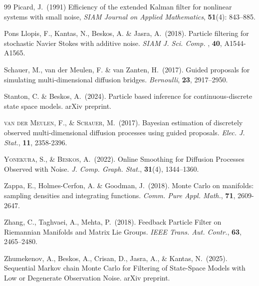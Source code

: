\documentclass[english,13pt]{article}
\numberwithin{equation}{section}
\begin{document}
\begin{thebibliography}{99}
{\sc Picard}, J.~(1991)  Efficiency of the extended Kalman filter for nonlinear systems with small noise, \emph{SIAM Journal on Applied Mathematics}, {\bf 51}(4): 843--885.

{\sc Pons Llopis}, F., {\sc Kantas}, N., {\sc Beskos}, A.  \& {\sc Jasra}, A.~(2018). Particle filtering for stochastic Navier Stokes with additive noise.  \emph{SIAM J. Sci. Comp. }, {\bf 40},  A1544-A1565.



{\sc Schauer}, M., {\sc van der Meulen}, F. \& {\sc van Zanten}, H.~(2017). Guided proposals for simulating multi-dimensional diffusion bridges. \emph{Bernoulli}, {\bf 23}, 2917--2950.

{\sc Stanton},   C.  \& {\sc Beskos},  A.~(2024).  Particle based inference for continuous-discrete state space models.  arXiv preprint.

\textsc{van der Meulen}, F., \& \textsc{Schauer}, M.~(2017). Bayesian estimation of discretely observed multi-dimensional diffusion processes using guided proposals. \emph{Elec. J. Stat.}, {\bf 11}, 2358-2396. 

\textsc{Yonekura}, S., \& \textsc{Beskos}, A.~(2022). Online Smoothing for Diffusion Processes Observed with Noise. \emph{J. Comp. Graph. Stat.}, {\bf 31}(4), 1344--1360. 

{\sc Zappa},  E.,  {\sc Holmes-Cerfon},  A. \& {\sc Goodman},  J.~(2018).  Monte Carlo on manifolds: sampling densities and integrating functions.  \emph{Comm.  Pure Appl.  Math.}, {\bf 71},  2609-2647.

{\sc Zhang},  C.,  {\sc Taghvaei},  A., {\sc Mehta}, P.~(2018).  Feedback Particle Filter on Riemannian Manifolds and Matrix Lie Groups.  \emph{IEEE Trans.  Aut. Contr.},  {\bf 63},  2465--2480.

{\sc Zhumekenov},  A.,  {\sc Beskos}, A., {\sc Crisan}, D.,  {\sc Jasra}, A.,  \& {\sc Kantas}, N.~(2025).
Sequential Markov chain Monte Carlo for Filtering of State-Space Models with Low or Degenerate Observation Noise.  arXiv preprint.

\end{thebibliography}
\end{document}
